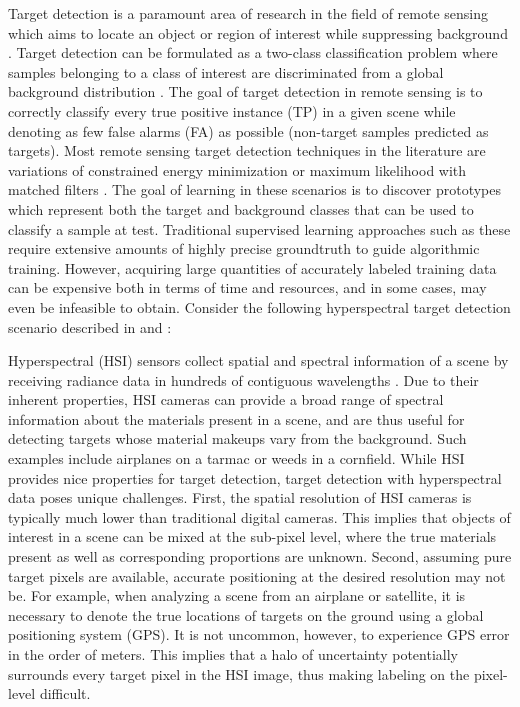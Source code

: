 Target detection is a paramount area of research in the field of remote sensing which aims to locate an object or region of interest while suppressing background \cite{Geng2017TargetDetection,Chaudhuri1995TargetDetection}.  Target detection can be formulated as a two-class classification problem where samples belonging to a class of interest are discriminated from a global background distribution \cite{Zare2016MIACE}.  The goal of target detection in remote sensing is to correctly classify every true positive instance (TP) in a given scene while denoting as few false alarms (FA) as possible (non-target samples predicted as targets).  Most remote sensing target detection techniques in the literature are variations of constrained energy minimization or maximum likelihood with matched filters \cite{Geng2017TargetDetection,Chaudhuri1995TargetDetection}. The goal of learning in these scenarios is to discover prototypes which represent both the target and background classes that can be used to classify a sample at test.  Traditional supervised learning approaches such as these require extensive amounts of highly precise groundtruth to guide algorithmic training.  However, acquiring large quantities  of accurately labeled training data can be expensive both in terms of time and resources, and in some cases, may even be infeasible to obtain.  Consider the following hyperspectral target detection scenario described in \cite{Du2017Thesis} and \cite{Bocinsky2019Thesis}:  

Hyperspectral (HSI) sensors collect spatial and spectral information of a scene by receiving radiance data in hundreds of contiguous wavelengths \cite{Zare2008Thesis}.  Due to their inherent properties, HSI cameras can provide a broad range of spectral information about the materials present in a scene, and are thus useful for detecting targets whose material makeups vary from the background.  Such examples include airplanes on a tarmac or weeds in a cornfield.  While HSI provides nice properties for target detection, target detection with hyperspectral data poses unique challenges.  First, the spatial resolution of HSI cameras is typically much lower than traditional digital cameras.  This implies that objects of interest in a scene can be mixed at the sub-pixel level, where the true materials present as well as corresponding proportions are unknown. Second, assuming pure target pixels are available, accurate positioning at the desired resolution may not be.  For example, when analyzing a scene from an airplane or satellite, it is necessary to denote the true locations of targets on the ground using a global positioning system (GPS). It is not uncommon, however, to experience GPS error in the order of meters.  This implies that a halo of uncertainty potentially surrounds every target pixel in the HSI image, thus making labeling on the pixel-level difficult.


